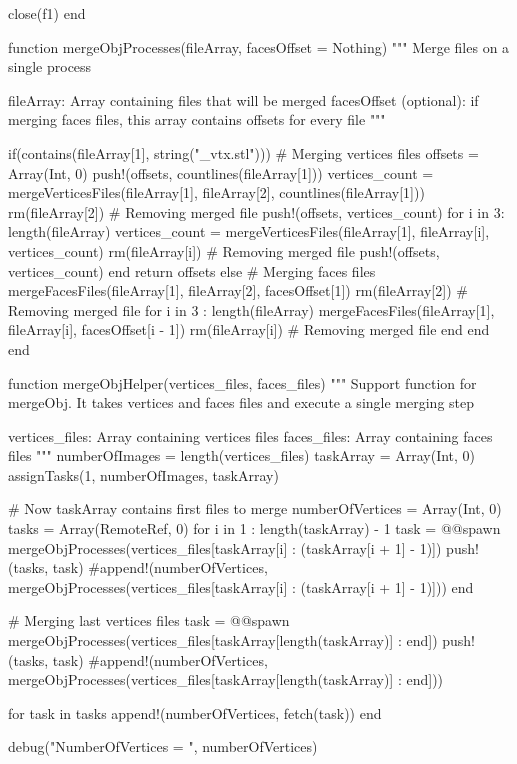 \documentclass[11pt,oneside]{article}	%
\begin{document}
{  close(f1)
end

function mergeObjProcesses(fileArray, facesOffset = Nothing)
  """
  Merge files on a single process

  fileArray: Array containing files that will be merged
  facesOffset (optional): if merging faces files, this array contains
    offsets for every file
  """

  if(contains(fileArray[1], string("_vtx.stl")))
    # Merging vertices files
    offsets = Array(Int, 0)
    push!(offsets, countlines(fileArray[1]))
    vertices_count = mergeVerticesFiles(fileArray[1], fileArray[2], countlines(fileArray[1]))
    rm(fileArray[2]) # Removing merged file
    push!(offsets, vertices_count)
    for i in 3: length(fileArray)
      vertices_count = mergeVerticesFiles(fileArray[1], fileArray[i], vertices_count)
      rm(fileArray[i]) # Removing merged file
      push!(offsets, vertices_count)
    end
    return offsets
  else
    # Merging faces files
    mergeFacesFiles(fileArray[1], fileArray[2], facesOffset[1])
    rm(fileArray[2]) # Removing merged file
    for i in 3 : length(fileArray)
      mergeFacesFiles(fileArray[1], fileArray[i], facesOffset[i - 1])
      rm(fileArray[i]) # Removing merged file
    end
  end
end

function mergeObjHelper(vertices_files, faces_files)
  """
  Support function for mergeObj. It takes vertices and faces files
  and execute a single merging step

  vertices_files: Array containing vertices files
  faces_files: Array containing faces files
  """
  numberOfImages = length(vertices_files)
  taskArray = Array(Int, 0)
  assignTasks(1, numberOfImages, taskArray)

  # Now taskArray contains first files to merge
  numberOfVertices = Array(Int, 0)
  tasks = Array(RemoteRef, 0)
  for i in 1 : length(taskArray) - 1
    task = @@spawn mergeObjProcesses(vertices_files[taskArray[i] : (taskArray[i + 1] - 1)])
    push!(tasks, task)
    #append!(numberOfVertices, mergeObjProcesses(vertices_files[taskArray[i] : (taskArray[i + 1] - 1)]))
  end

  # Merging last vertices files
  task = @@spawn mergeObjProcesses(vertices_files[taskArray[length(taskArray)] : end])
  push!(tasks, task)
  #append!(numberOfVertices, mergeObjProcesses(vertices_files[taskArray[length(taskArray)] : end]))


  for task in tasks
    append!(numberOfVertices, fetch(task))
  end

  debug("NumberOfVertices = ", numberOfVertices)

}
\end{document}
